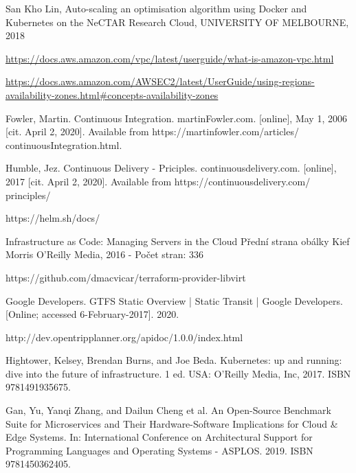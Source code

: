 \documentclass[thesis=M,czech]{FITthesis}[2019/12/23]
\theoremstyle{plain}
\theoremstyle{definition}
\begin{document}
\begin{thebibliography}{9}


San Kho Lin, Auto-scaling an optimisation algorithm using Docker and Kubernetes on the NeCTAR Research Cloud, UNIVERSITY OF MELBOURNE, 2018




\url{https://docs.aws.amazon.com/vpc/latest/userguide/what-is-amazon-vpc.html
}


\url{https://docs.aws.amazon.com/AWSEC2/latest/UserGuide/using-regions-availability-zones.html#concepts-availability-zones
}


Fowler, Martin. Continuous Integration. martinFowler.com. [online], May 1,
2006 [cit. April 2, 2020]. Available from https://martinfowler.com/articles/
continuousIntegration.html.


Humble, Jez. Continuous Delivery - Priciples. continuousdelivery.com. [online],
2017 [cit. April 2, 2020]. Available from https://continuousdelivery.com/
principles/

https://helm.sh/docs/



Infrastructure as Code: Managing Servers in the Cloud
Přední strana obálky
Kief Morris
O'Reilly Media, 2016 - Počet stran: 336


https://github.com/dmacvicar/terraform-provider-libvirt


Google Developers. GTFS Static Overview | Static Transit | Google Developers. [Online; accessed 6-February-2017]. 2020.


http://dev.opentripplanner.org/apidoc/1.0.0/index.html


Hightower, Kelsey, Brendan Burns, and Joe Beda. Kubernetes: up and running: dive into the future of infrastructure. 1 ed. USA: O’Reilly Media, Inc, 2017.
ISBN 9781491935675.



Gan, Yu, Yanqi Zhang, and Dailun Cheng et al. An Open-Source Benchmark
Suite for Microservices and Their Hardware-Software Implications for Cloud \&
Edge Systems. In: International Conference on Architectural Support for Programming Languages and Operating Systems - ASPLOS. 2019. ISBN 9781450362405.



\end{thebibliography}
\end{document}
